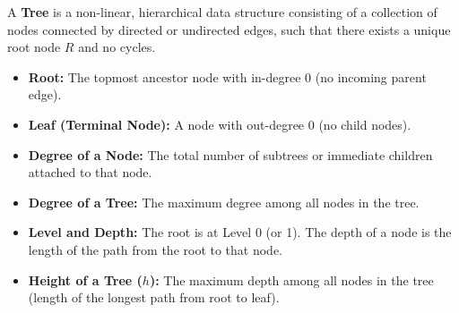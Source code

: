 \documentclass[12pt,a4paper]{article}
\begin{document}
\begin{tcolorbox}[defbox, title={\textbf{Definition: Tree Data Structure and Core Terminologies}}]
A \textbf{Tree} is a non-linear, hierarchical data structure consisting of a collection of nodes connected by directed or undirected edges, such that there exists a unique root node $R$ and no cycles.
\par\vspace{4pt}
\begin{itemize}[leftmargin=*, itemsep=2pt]
  \item \textbf{Root:} The topmost ancestor node with in-degree 0 (no incoming parent edge).
  \item \textbf{Leaf (Terminal Node):} A node with out-degree 0 (no child nodes).
  \item \textbf{Degree of a Node:} The total number of subtrees or immediate children attached to that node.
  \item \textbf{Degree of a Tree:} The maximum degree among all nodes in the tree.
  \item \textbf{Level and Depth:} The root is at Level 0 (or 1). The depth of a node is the length of the path from the root to that node.
  \item \textbf{Height of a Tree ($h$):} The maximum depth among all nodes in the tree (length of the longest path from root to leaf).
\end{itemize}
\end{tcolorbox}
\end{document}
